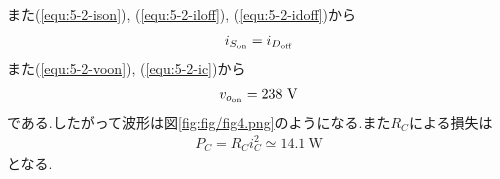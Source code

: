 また(\ref{equ:5-2-ison}), (\ref{equ:5-2-iloff}), (\ref{equ:5-2-idoff})から
\begin{align}
  i_{S_{\rm on}}=i_{D_{\rm off}}
\end{align}
また(\ref{equ:5-2-voon}), (\ref{equ:5-2-ic})から
\begin{align}
  v_{o_{\rm on}}=238\ \si{\volt}
\end{align}
である.したがって波形は図\ref{fig:fig/fig4.png}のようになる.また$R_C$による損失は
\begin{align}
  P_C=R_Ci_C^2\simeq14.1\ \si{\watt}
\end{align}
となる.
